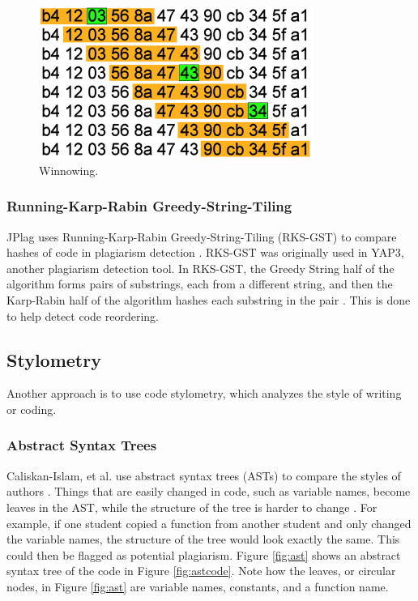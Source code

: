 \documentclass[10pt,journal,compsoc]{IEEEtran}
\begin{document}
			\begin{figure}[h!]
				\includegraphics[width=0.8\textwidth]{Winnowing.png}
				\caption{Winnowing.}
				\label{fig:winnowing1}
			\end{figure}
		
			\subsubsection{Running-Karp-Rabin Greedy-String-Tiling}
			JPlag uses Running-Karp-Rabin Greedy-String-Tiling (RKS-GST) to compare hashes of code in plagiarism detection \cite{prechelt+malpohl+philippsen}. RKS-GST was originally used in YAP3, another plagiarism detection tool. In RKS-GST, the Greedy String half of the algorithm forms pairs of substrings, each from a different string, and then the Karp-Rabin half of the algorithm hashes each substring in the pair \cite{wise}. This is done to help detect code reordering.
		
		\subsection{Stylometry}
		Another approach is to use code stylometry, which analyzes the style of writing or coding.
		
			\subsubsection{Abstract Syntax Trees}
			Caliskan-Islam, et al. use abstract syntax trees (ASTs) to compare the styles of authors \cite{caliskan-islam+harang+liu}. Things that are easily changed in code, such as variable names, become leaves in the AST, while the structure of the tree is harder to change \cite{caliskan-islam+harang+liu}. For example, if one student copied a function from another student and only changed the variable names, the structure of the tree would look exactly the same. This could then be flagged as potential plagiarism. Figure \ref{fig:ast} shows an abstract syntax tree of the code in Figure \ref{fig:astcode}. Note how the leaves, or circular nodes, in Figure \ref{fig:ast} are variable names, constants, and a function name.
		
\end{document}
